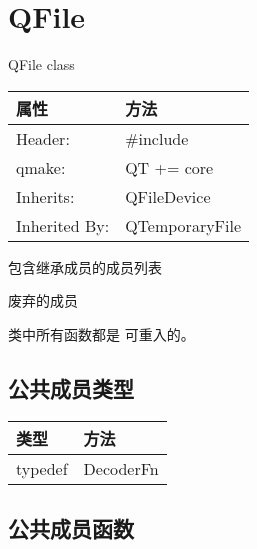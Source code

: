 \chapter{QFile}

QFile class 

\splitLine 

\begin{tabular}{|l|l|}
\hline
属性 	&方法\\
\hline
Header: &	\#include\\
\hline
qmake: &	QT += core\\
\hline
Inherits: &	QFileDevice\\
\hline
Inherited By:& 	QTemporaryFile\\
\hline
\end{tabular}

\begin{compactitem}
\item 包含继承成员的成员列表
\item 废弃的成员
\end{compactitem}


\begin{notice}
	类中所有函数都是 可重入的。
\end{notice}
 

\splitLine

\section{公共成员类型}

\begin{tabular}{|l|l|}
\hline
类型& 	方法\\
\hline
typedef& 	DecoderFn\\
\hline
\end{tabular}

\splitLine

\section{公共成员函数}

